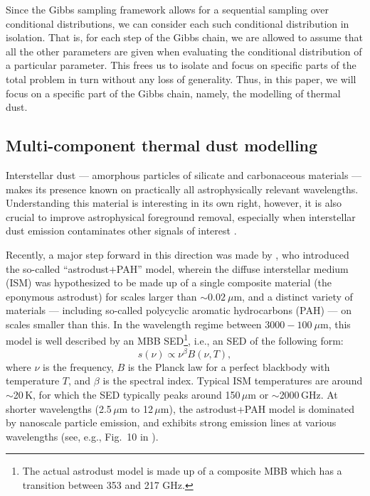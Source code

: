 \documentclass{aa}
\begin{document}
{Since the Gibbs sampling framework allows for a sequential sampling over
conditional distributions, we can consider each such conditional distribution
in isolation. That is, for each step of the Gibbs chain, we are allowed to
assume that all the other parameters are given when evaluating the conditional
distribution of a particular parameter. This frees us to isolate and focus on
specific parts of the total problem in turn without any loss of generality.
Thus, in this paper, we will focus on a specific part of the Gibbs chain,
namely, the modelling of thermal dust.

\subsection{Multi-component thermal dust modelling}
\label{sec:modelling}
Interstellar dust --- amorphous particles of silicate and carbonaceous
materials --- makes its presence known on practically all
astrophysically relevant wavelengths. Understanding this material is
interesting in its own right, however, it is also crucial to improve
astrophysical foreground removal, especially when interstellar dust
emission contaminates other signals of interest
\citep[e.g.,][]{Hensley2021}.

Recently, a major step forward in this direction was made by
\citet{Hensley2023}, who introduced the so-called ``astrodust+PAH''
model, wherein the diffuse interstellar medium (ISM) was hypothesized
to be made up of a single composite material (the eponymous astrodust)
for scales larger than $\sim0.02~\mu$m, and a distinct variety of
materials --- including so-called polycyclic aromatic hydrocarbons
(PAH) --- on scales smaller than this. In the wavelength regime
between $3000-100~\mu$m, this model is well described by an MBB
SED\footnote{The actual astrodust model is made up of a composite MBB
which has a transition between 353 and 217 GHz.}, i.e., an SED of the following form:
\begin{equation}
s(\nu) \propto \nu^\beta B(\nu, T),
\label{eq:mbb}
\end{equation}
where $\nu$ is the frequency, $B$ is the Planck law for a perfect
blackbody with temperature $T$, and $\beta$ is the spectral index.
Typical ISM temperatures are around $\sim$20\,K, for which the SED
typically peaks around 150\,$\mu$m or $\sim$2000\,GHz. At shorter
wavelengths (2.5\,$\mu$m to 12\,$\mu$m), the astrodust+PAH model is
dominated by nanoscale particle emission, and exhibits strong emission
lines at various wavelengths (see, e.g., Fig.~10 in \citealt{Hensley2023}).

}
\end{document}
